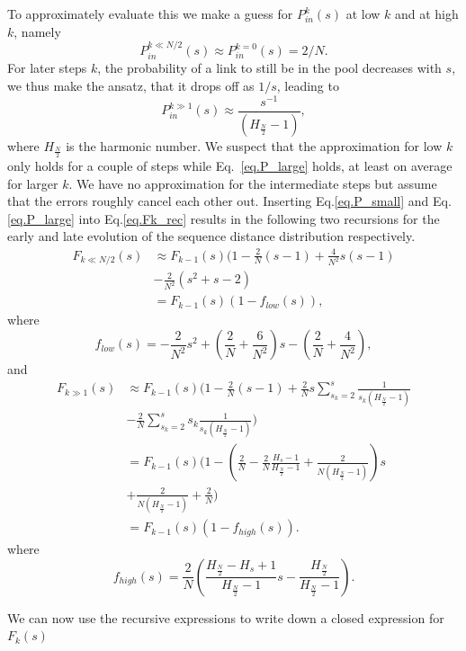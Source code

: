 \documentclass[
reprint,
twocolumn,
amsmath,amssymb,superscriptaddress,aps,
pre]{revtex4-1}
\begin{document}
To approximately evaluate this we make a guess for $P_{in}^k(s)$ at low $k$ and at high $k$, namely
\begin{equation}
    P_{in}^{k\ll N/2}(s)\approx P_{in}^{k=0}(s)=2/N.
    \label{eq.P_small}
\end{equation}
For later steps $k$, the probability of a link to still be in the pool decreases with $s$, we thus make the ansatz, that it drops off as $1/s$, leading to
\begin{equation}
    P_{in}^{k\gg 1}(s)\approx \frac{s^{-1}}{ (H_{\frac{N}{2}}-1)},
    \label{eq.P_large}
\end{equation}
where $H_{\frac{N}{2}}$ is the harmonic number. 
We suspect that the approximation for low $k$ only holds for a couple of steps while Eq.~\ref{eq.P_large} holds, at least on average for larger $k$. We have no approximation for the intermediate steps but assume that the errors roughly cancel each other out. Inserting Eq.\ref{eq.P_small} and Eq.\ref{eq.P_large} into Eq.\ref{eq.Fk_rec} results in the following two recursions for the early and late evolution of the sequence distance distribution respectively.
\begin{align}
   F_{k\ll N/2}(s)&\approx 
   F_{k-1}(s)(1-\frac{2}{N} (s-1) 
   +\frac{4}{N^2} s (s-1)\nonumber \\
   &-\frac{2}{N^2}(s^2+s-2)\nonumber \\
   &=F_{k-1}(s)(1-f_{low}(s)),
   \label{eq.Fk_rec_low}
\end{align}
where 
\[f_{low}(s)=-\frac{2}{N^2}s^2+(\frac{2}{N}+\frac{6}{N^2})s-(\frac{2}{N}+\frac{4}{N^2}),\]
and
\begin{align}
   F_{k\gg1}(s)&\approx 
   F_{k-1}(s)(1-\frac{2}{N} (s-1) 
   +\frac{2}{N} s \sum_{s_k=2}^{s}\frac{1}{s_k(H_{\frac{N}{2}}-1)}\nonumber \\
   &-\frac{2}{N}
   \sum_{s_k=2}^{s} s_k \frac{1}{s_k(H_{\frac{N}{2}}-1)})\nonumber \\
   &=
   F_{k-1}(s)(1 -(\frac{2}{N}-\frac{2}{N}\frac{H_{s}-1}{H_{\frac{N}{2}}-1}+\frac{2}{N(H_{\frac{N}{2}}-1)})s \nonumber \\ 
   &+ \frac{2}{N(H_{\frac{N}{2}}-1)} + \frac{2}{N})\nonumber \\
   &=F_{k-1}(s)(1-f_{high}(s)).
   \label{eq.Fk_rec_high}
\end{align}
where 
\[f_{high}(s)=\frac{2}{N}(\frac{H_{\frac{N}{2}}-H_{s}+1}{H_{\frac{N}{2}}-1}s-\frac{H_{\frac{N}{2}}}{H_{\frac{N}{2}}-1}).\]

We can now use the recursive expressions to write down a closed expression for $F_k(s)$
\end{document}
